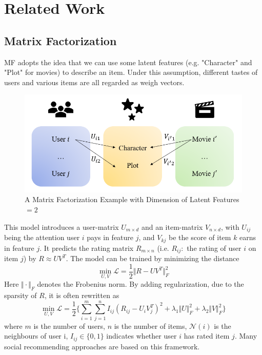 \documentclass{article}
\begin{document}
\section{Related Work}
\label{related_work}

\subsection{Matrix Factorization}

MF adopts the idea that we can use some latent features (e.g. "Character" and "Plot" for movies) to 
describe an item. Under this assumption, different tastes of users 
and various items are all regarded as weigh vectors. 
\begin{figure}[h]
  \centering
  \includegraphics[scale=0.4]{pic/figure1.png}
  \caption{A Matrix Factorization Example with Dimension of Latent Features $=2$}
\end{figure} 

This model introduces a user-matrix $U_{m \times d}$ and an item-matrix $V_{n \times d}$, with 
$U_{ij}$ being the attention user $i$ pays in feature $j$, and $V_{kj}$ be the score of item $k$ 
earns in feature $j$. It predicts the rating matrix $R_{m \times n}$ (i.e. $R_{ij}: $ the rating of user $i$ on item $j$) 
by $R \approx U V^T$. The model can be trained by minimizing the distance
$$ \min_{U, V} \mathcal{L} = \frac{1}{2} \Vert R - UV^T \Vert_F^2 $$
Here $\Vert \cdot \Vert_F$ denotes the Frobenius norm. 
By adding regularization, due to the sparsity of $R$, it is often rewritten as
\begin{equation}
  \min_{U, V} \mathcal{L} = \frac{1}{2} \{\sum_{i=1}^m \sum_{j=1}^n I_{ij} (R_{ij} - U_iV_j^T)^2 + \lambda_1 \Vert U \Vert_F^2 + \lambda_2 \Vert V \Vert_F^2 \}
\end{equation} 
where $m$ is the number of users, $n$ is the number of items, $\mathcal{N}(i)$ is 
the neighbours of user i, $I_{ij} \in \{0, 1\}$ indicates whether user $i$ has rated item $j$. 
Many social recommending approaches \cite{ma2011rsr, jam2010trust, ma2009rste} are based on this framework.
\end{document}
